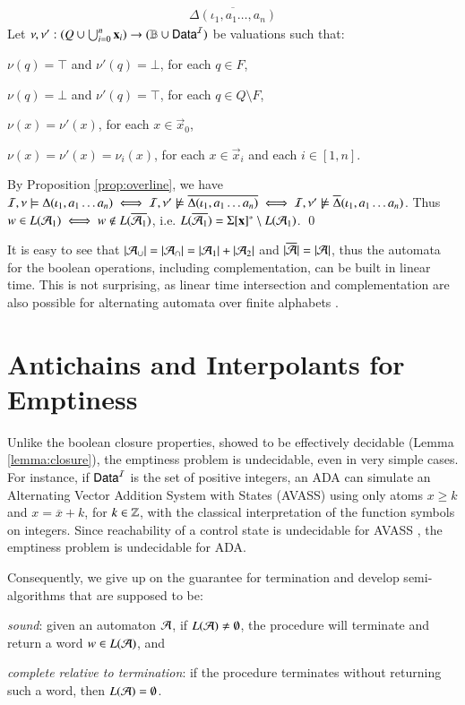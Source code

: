 \documentclass[10pt,conference,letterpaper,twocolumn]{IEEEtran}
\begin{document}
{\[\begin{array}{lcl}
  \overline{\Delta(\iota_1,a_1\ldots,a_n)}
  \end{array}\]
  Let $\nu,\nu' : (Q \cup \bigcup_{i=0}^n\mathbf x_i) \rightarrow (\mathbb{B}
  \cup \mathsf{Data}^{\mathcal{I}})$ be valuations such that: \begin{compactitem}
  \item $\nu(q) = \top$ and $\nu'(q) = \bot$, for each $q \in F$, 
  \item $\nu(q) = \bot$ and $\nu'(q) = \top$, for each $q \in Q \setminus F$, 
  \item $\nu(x) = \nu'(x)$, for each $x \in \vec{x}_0$, 
  \item $\nu(x) = \nu'(x) = \nu_i(x)$, for each $x \in \vec{x}_i$ and each $i
    \in [1,n]$.
  \end{compactitem}
  By Proposition \ref{prop:overline}, we have $\mathcal{I},\nu \models
  \Delta(\iota_1,a_1 \ldots a_n) \iff \mathcal{I},\nu' \not\models
  \overline{\Delta(\iota_1,a_1 \ldots a_n)} \iff \mathcal{I},\nu' \not\models
  \overline{\Delta}(\iota_1,a_1 \ldots a_n)$. Thus $w \in L(\mathcal{A}_1) \iff
  w \not\in L(\overline{\mathcal{A}_1})$, i.e. $L(\overline{\mathcal{A}_1}) =
  \Sigma[\mathbf x]^* \setminus L(\mathcal{A}_1)$. \qed}

It is easy to see that ${|{\mathcal{A}_\cup}|} = {|{\mathcal{A}_\cap}|} = {|{\mathcal{A}_1}|} +
{|{\mathcal{A}_2}|}$ and ${|{\overline{\mathcal{A}}}|} = {|{\mathcal{A}}|}$, thus the automata
for the boolean operations, including complementation, can be built in
linear time. This is not surprising, as linear time intersection and
complementation are also possible for alternating automata over finite
alphabets \cite{ChandraKozenStockmeyer81}.

\section{Antichains and Interpolants for Emptiness}

Unlike the boolean closure properties, showed to be effectively
decidable (Lemma \ref{lemma:closure}), the emptiness problem is
undecidable, even in very simple cases. For instance, if $\mathsf{Data}^{\mathcal{I}}$ is
the set of positive integers, an ADA can simulate an Alternating
Vector Addition System with States (AVASS) \cite{LazicSchmitz14} using
only atoms $x \geq k$ and $x = \overline{x} + k$, for $k \in {\bf \mathbb{Z}}$,
with the classical interpretation of the function symbols on
integers. Since reachability of a control state is undecidable for
AVASS \cite{LINCOLN92}, the emptiness problem is undecidable for ADA.

Consequently, we give up on the guarantee for termination and develop
semi-algorithms that are supposed to be: \begin{compactenum}
\item \emph{sound}: given an automaton $\mathcal{A}$, if $L(\mathcal{A}) \neq\emptyset$,
  the procedure will terminate and return a word $w \in L(\mathcal{A})$, and
%
\item \emph{complete relative to termination}: if the procedure terminates
  without returning such a word, then $L(\mathcal{A}) = \emptyset$. 
\end{compactenum}
\end{document}
